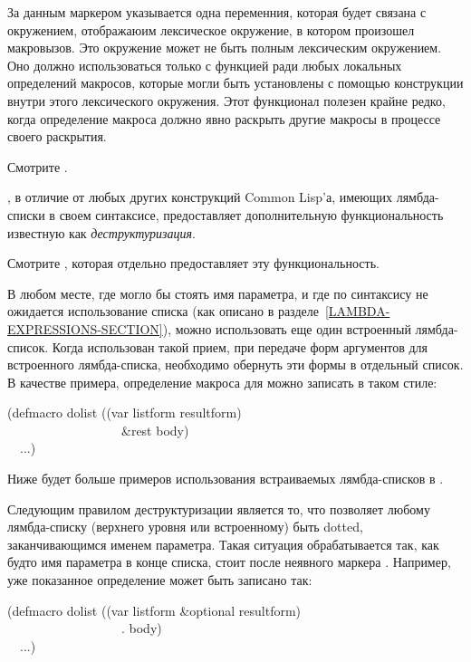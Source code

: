 \begin{defmac}
\begin{indentdesc}{6pc}
\item[\cd{\&environment}]

За данным маркером указывается одна переменния, которая будет связана с
окружением, отображаюим лексическое окружение, в котором произошел
макровызов. Это окружение может не быть полным лексическим окружением. Оно
должно использоваться только с функцией  ради любых локальных
определений макросов, которые могли быть установлены с помощью 
конструкции внутри этого лексического окружения. Этот функционал полезен крайне
редко, когда определение макроса должно явно раскрыть другие макросы в процессе
своего раскрытия.
\end{indentdesc}

Смотрите .

, в отличие от любых других конструкций Common Lisp'а, имеющих
лямбда-списки в своем синтаксисе, предоставляет дополнительную функциональность
известную как \emph{деструктуризация}.
\begin{newer}
Смотрите , которая отдельно предоставляет эту функциональность.
\end{newer}
В любом месте, где могло бы стоять имя параметра, и где по синтаксису не
ожидается использование списка (как описано в
разделе~\ref{LAMBDA-EXPRESSIONS-SECTION}), можно использовать еще один
встроенный лямбда-список. Когда использован такой прием, при передаче форм
аргументов для встроенного лямбда-списка, необходимо обернуть эти формы в
отдельный список.
В качестве примера, определение макроса для  можно записать в таком
стиле:
\begin{lisp}
(defmacro dolist ((var listform  resultform) \\
~~~~~~~~~~~~~~~~~~\&rest body) \\
~~...)
\end{lisp}
Ниже будет больше примеров использования встраиваемых лямбда-списков в
.

Следующим правилом деструктуризации является то, что  позволяет
любому лямбда-списку (верхнего уровня или встроенному) быть dotted,
заканчивающимся именем параметра. Такая ситуация обрабатывается так, как будто
имя параметра в конце списка, стоит после неявного маркера .
Например, уже показанное определение  может быть записано так:
\begin{lisp}
(defmacro dolist ((var listform \&optional resultform) \\
~~~~~~~~~~~~~~~~~~. body) \\
~~...)
\end{lisp}


\end{defmac}
